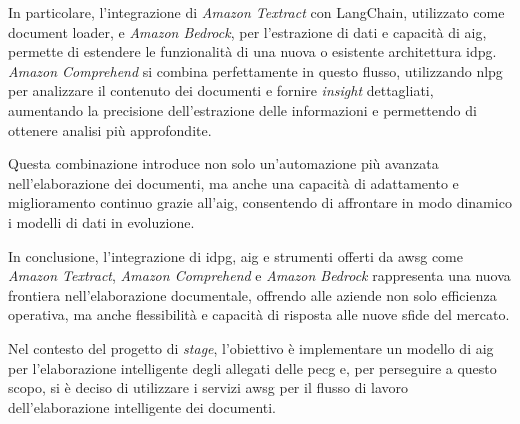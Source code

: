 In particolare, l'integrazione di \emph{Amazon Textract} con LangChain, utilizzato come document loader, e \emph{Amazon Bedrock}, per l'estrazione di dati e capacità di \gls{aig}, permette di estendere le funzionalità di una nuova o esistente architettura \gls{idpg}. \emph{Amazon Comprehend} si combina perfettamente in questo flusso, utilizzando \gls{nlpg} per analizzare il contenuto dei documenti e fornire \emph{insight} dettagliati, aumentando la precisione dell'estrazione delle informazioni e permettendo di ottenere analisi più approfondite.

Questa combinazione introduce non solo un'automazione più avanzata nell'elaborazione dei documenti, ma anche una capacità di adattamento e miglioramento continuo grazie all'\gls{aig}, consentendo di affrontare in modo dinamico i modelli di dati in evoluzione.

In conclusione, l'integrazione di \gls{idpg}, \gls{aig} e strumenti offerti da \gls{awsg} come \emph{Amazon Textract}, \emph{Amazon Comprehend} e \emph{Amazon Bedrock} rappresenta una nuova frontiera nell'elaborazione documentale, offrendo alle aziende non solo efficienza operativa, ma anche flessibilità e capacità di risposta alle nuove sfide del mercato.

Nel contesto del progetto di \emph{stage}, l'obiettivo è implementare un modello di \gls{aig} per l'elaborazione intelligente degli allegati delle \gls{pecg} e, per perseguire a questo scopo, si è deciso di utilizzare i servizi \gls{awsg} per il flusso di lavoro dell'elaborazione intelligente dei documenti.


%
%
%
